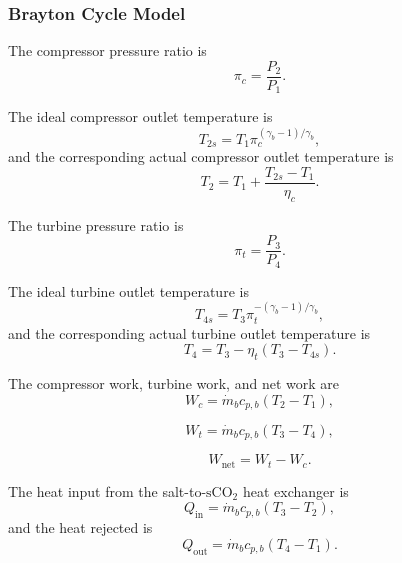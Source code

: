 \documentclass[a4paper,12pt]{article}
\begin{document}
\subsubsection{Brayton Cycle Model}

The compressor pressure ratio is
\begin{equation}
\pi_c=\frac{P_2}{P_1}.
\label{eq:compressor_pressure_ratio}
\end{equation}

The ideal compressor outlet temperature is
\begin{equation}
T_{2s}
=
T_1
\pi_c^{(\gamma_b-1)/\gamma_b},
\label{eq:compressor_ideal}
\end{equation}
and the corresponding actual compressor outlet temperature is
\begin{equation}
T_2
=
T_1
+
\frac{T_{2s}-T_1}{\eta_c}.
\label{eq:compressor_actual}
\end{equation}

The turbine pressure ratio is
\begin{equation}
\pi_t=\frac{P_3}{P_4}.
\label{eq:turbine_pressure_ratio}
\end{equation}

The ideal turbine outlet temperature is
\begin{equation}
T_{4s}
=
T_3
\pi_t^{-(\gamma_b-1)/\gamma_b},
\label{eq:turbine_ideal}
\end{equation}
and the corresponding actual turbine outlet temperature is
\begin{equation}
T_4
=
T_3
-
\eta_t
\left(
T_3-T_{4s}
\right).
\label{eq:turbine_actual}
\end{equation}

The compressor work, turbine work, and net work are
\begin{equation}
W_c
=
\dot{m}_b c_{p,b}
\left(
T_2-T_1
\right),
\label{eq:compressor_work}
\end{equation}

\begin{equation}
W_t
=
\dot{m}_b c_{p,b}
\left(
T_3-T_4
\right),
\label{eq:turbine_work}
\end{equation}

\begin{equation}
W_{\mathrm{net}}
=
W_t-W_c.
\label{eq:net_work}
\end{equation}

The heat input from the salt-to-\(\mathrm{sCO_2}\) heat exchanger is
\begin{equation}
Q_{\mathrm{in}}
=
\dot{m}_b c_{p,b}
\left(
T_3-T_2
\right),
\label{eq:brayton_heat_input}
\end{equation}
and the heat rejected is
\begin{equation}
Q_{\mathrm{out}}
=
\dot{m}_b c_{p,b}
\left(
T_4-T_1
\right).
\label{eq:brayton_heat_rejection}
\end{equation}
\end{document}
